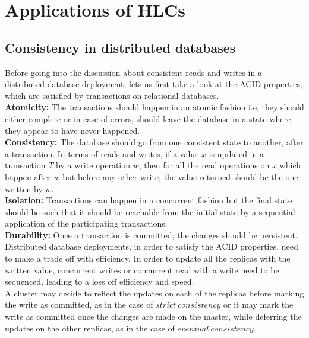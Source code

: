 \documentclass{article}
\begin{document}
    \section{Applications of HLCs}

    \subsection{Consistency in distributed databases}

    Before going into the discussion about consistent reads and writes in a distributed database deployment, lets us first take a look at the ACID properties, which are satisfied by transactions on relational databases. \\

    \noindent \textbf{Atomicity:} The transactions should happen in an atomic fashion i.e, they should either complete or in case of errors, should leave the database in a state where they appear to have never happened.\\

    \noindent \textbf{Consistency:} The database should go from one consistent state to another, after a transaction. In terms of reads and writes, if a value $x$ is updated in a transaction $T$ by a write operation $w$, then for all the read operations on $x$ which happen after $w$ but before any other write, the value returned should be the one written by $w$. \\

    \noindent \textbf{Isolation:} Transactions can happen in a concurrent fashion but the final state should be such that it should be reachable from the initial state by a sequential application of the participating transactions. \\

    \noindent \textbf{Durability:} Once a transaction is committed, the changes should be persistent. \\

    Distributed database deployments, in order to satisfy the ACID properties, need to make a trade off with efficiency. In order to update all the replicas with the written value, concurrent writes or concurrent read with a write need to be sequenced, leading to a loss off efficiency and speed. \\

    A cluster may decide to reflect the updates on each of the replicas before marking the write as committed, as in the case of $strict\ consistency$ or it may mark the write as committed once the changes are made on the master, while deferring the updates on the other replicas, as in the case of $eventual\ consistency$.
\end{document}
